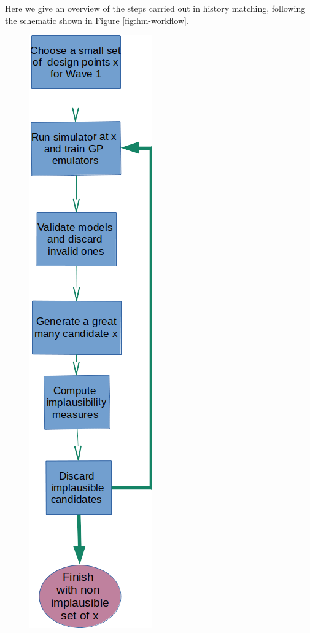 \documentclass[
  12pt,
  a4paper,
  twoside]{book}
\begin{document}
Here we give an overview of the steps carried out in history matching, following the schematic shown in Figure \ref{fig:hm-workflow}.

\newpage
\begin{figure}[H]

{\centering \includegraphics[width=0.8\linewidth]{figures/hm-workflow-vertical} 

}
\end{figure}
\end{document}
